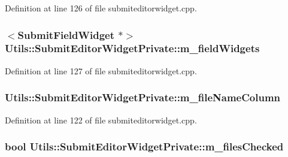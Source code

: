 Definition at line 126 of file submiteditorwidget.\-cpp.

\hypertarget{struct_utils_1_1_submit_editor_widget_private_abde8ff2c29d77121652458c01a6146d9}{
\subsubsection[{m\-\_\-field\-Widgets}]{$<${\bf Submit\-Field\-Widget} $\ast$$>$ Utils\-::\-Submit\-Editor\-Widget\-Private\-::m\-\_\-field\-Widgets}}\label{struct_utils_1_1_submit_editor_widget_private_abde8ff2c29d77121652458c01a6146d9}


Definition at line 127 of file submiteditorwidget.\-cpp.

\hypertarget{struct_utils_1_1_submit_editor_widget_private_ab07726bb11a9c52f9a0915170c6bb0fd}{
\subsubsection[{m\-\_\-file\-Name\-Column}]{ Utils\-::\-Submit\-Editor\-Widget\-Private\-::m\-\_\-file\-Name\-Column}}\label{struct_utils_1_1_submit_editor_widget_private_ab07726bb11a9c52f9a0915170c6bb0fd}


Definition at line 122 of file submiteditorwidget.\-cpp.

\hypertarget{struct_utils_1_1_submit_editor_widget_private_aeb1241360fb4385d02bd11f12192dc51}{
\subsubsection[{m\-\_\-files\-Checked}]{\setlength{\rightskip}{0pt plus 5cm}bool Utils\-::\-Submit\-Editor\-Widget\-Private\-::m\-\_\-files\-Checked}}\label{struct_utils_1_1_submit_editor_widget_private_aeb1241360fb4385d02bd11f12192dc51}


